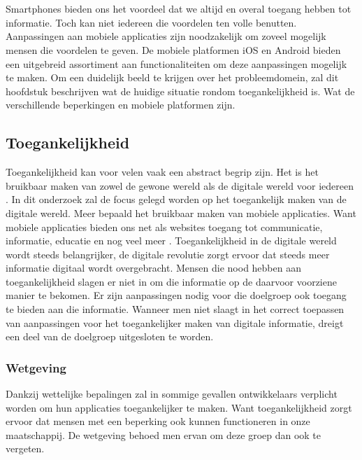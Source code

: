 \chapter{}
\label{ch:stand-van-zaken}
Smartphones bieden ons het voordeel dat we altijd en overal toegang hebben tot informatie. Toch kan niet iedereen die voordelen ten volle benutten.  Aanpassingen aan mobiele applicaties zijn noodzakelijk om zoveel mogelijk mensen die voordelen te geven. De mobiele platformen iOS en Android bieden een uitgebreid assortiment aan functionaliteiten om deze aanpassingen mogelijk te maken. Om een duidelijk beeld te krijgen over het probleemdomein, zal dit hoofdstuk beschrijven wat de huidige situatie rondom toegankelijkheid is. Wat de verschillende beperkingen en mobiele platformen zijn.



\section{Toegankelijkheid}
\label{sec:toegankelijkheid}
Toegankelijkheid kan voor velen vaak een abstract begrip zijn. Het is het bruikbaar maken van zowel de gewone wereld als de digitale wereld voor iedereen \autocite{anySurferWat}. In dit onderzoek zal de focus gelegd worden op het toegankelijk maken van de digitale wereld. Meer bepaald het bruikbaar maken van mobiele applicaties. Want mobiele applicaties bieden ons net als websites toegang tot communicatie, informatie, educatie en nog veel meer \autocite{introAccesibilityw3c}. Toegankelijkheid in de digitale wereld wordt steeds belangrijker, de digitale revolutie zorgt ervoor dat steeds meer informatie digitaal wordt overgebracht. Mensen die nood hebben aan toegankelijkheid slagen er niet in om die informatie op de daarvoor voorziene manier te bekomen. Er zijn aanpassingen nodig voor die doelgroep ook toegang te bieden aan die informatie.
Wanneer men niet slaagt in het correct toepassen van aanpassingen voor het toegankelijker maken van digitale informatie, dreigt een deel van de doelgroep uitgesloten te worden.





\subsection{Wetgeving}
\label{sec:wetgeving}
Dankzij wettelijke bepalingen zal in sommige gevallen ontwikkelaars verplicht worden om hun applicaties toegankelijker te maken. Want toegankelijkheid zorgt ervoor dat mensen met een beperking ook kunnen functioneren in onze maatschappij. De wetgeving behoed men ervan om deze groep dan ook te vergeten. 

